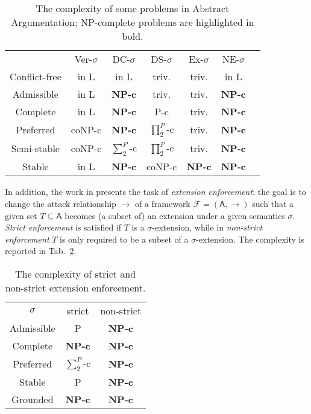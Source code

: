 \documentclass[conference]{IEEEtran}
\newcommand{\F}{\ensuremath{\mathcal{F}}\xspace} %
\newcommand{\args}{\ensuremath{\mathsf{A}}\xspace} %
\newcommand{\atts}{\ensuremath{\rightarrow}\xspace}
\begin{document}
\begin{table}[t]
	\centering
	\footnotesize
	\begin{tabular}{ccccccc}
		&  Ver-$\sigma$ &  DC-$\sigma$ & DS-$\sigma$ & Ex-$\sigma$ &
		NE-$\sigma$  \\
		Conflict-free & in L & in L & triv.& triv. & in L  \\
		Admissible & in L  & \bf{NP-c} & triv. & triv. &  \bf{NP-c}  \\
		Complete & in L &  \bf{NP-c} & P-c & triv. &  \bf{NP-c}  \\
		Preferred & coNP-c &  \bf{NP-c} & $\prod^{P}_{2}$-c& triv. &  \bf{NP-c} \\
		Semi-stable & coNP-c & $\sum^{P}_{2}$-c & $\prod^{P}_{2}$-c & triv. &  \bf{NP-c}  \\
		Stable & in L &  \bf{NP-c} & coNP-c &  \bf{NP-c} &  \bf{NP-c} \\
	\end{tabular}
	\caption{The complexity of some  problems in Abstract Argumentation; NP-complete problems are highlighted in bold.}
	\label{sec:complexity}
	\vspace{-0.5cm}
\end{table}

In addition, the work in \cite{extenf} presents the task of \emph{extension enforcement}: the goal is to change the attack relationship $\atts$ of a framework $\F=(\args,\atts)$ such that a given set $T \subseteq \args$ becomes (a subset of) an extension under a given semantics $\sigma$. \emph{Strict enforcement} is satisfied if $T$ is a $\sigma$-extension, while in \emph{non-strict enforcement} $T$ is only required to be a subset of a $\sigma$-extension. The complexity is reported in Tab.~\ref{sec:complexity2}.



\begin{table}[t]
	\centering
	\footnotesize
	\begin{tabular}{ccc}
		$\sigma$ &  strict & non-strict  \\
		Admissible & P  & \bf{NP-c}   \\
		Complete & \bf{NP-c} &  \bf{NP-c}  \\
		Preferred & $\sum^{P}_{2}$-c  &  \bf{NP-c}  \\
		Stable &  P & \bf{NP-c}  \\
		Grounded & \bf{NP-c} & \bf{NP-c}
	\end{tabular}
	\caption{The complexity of strict and non-strict extension enforcement.}
	\label{sec:complexity2}
	\vspace{-0.5cm}
\end{table}
\end{document}
